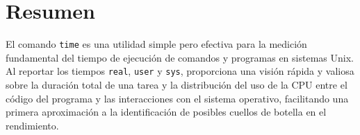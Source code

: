\documentclass{article}
\begin{document}
	\section{Resumen}
	El comando \texttt{time} es una utilidad simple pero efectiva para la medición fundamental del tiempo de ejecución de comandos y programas en sistemas Unix. Al reportar los tiempos \texttt{real}, \texttt{user} y \texttt{sys}, proporciona una visión rápida y valiosa sobre la duración total de una tarea y la distribución del uso de la CPU entre el código del programa y las interacciones con el sistema operativo, facilitando una primera aproximación a la identificación de posibles cuellos de botella en el rendimiento.
	
\end{document}
